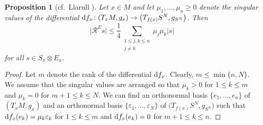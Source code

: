 \documentclass[11pt]{article}
\numberwithin{equation}{section}
\numberwithin{equation}{section}
\newtheorem{Proposition}[Theorem]{Proposition}
 { \theoremstyle{definition}
\newtheorem{Definition}[Theorem]{Definition}
\newtheorem{Note}[Theorem]{Note}
\newtheorem{Example}[Theorem]{Example}
\newtheorem{Remark}[Theorem]{Remark} }
\begin{document}
\begin{Proposition}[cf.\ Llarull \cite{Llarull}]
\label{curvature.term}
Let $x \in M$ and let $ \mu_1,\hdots,\mu_n \geq 0$ denote the singular values of the differential ${\rm d}f_x\colon (T_x M , g_x) \to \big(T_{f(x)} S^N,g_{S^N}\big)$. Then
\[
 \big|\mathcal{R}^E s\big| \leq \frac{1}{4} \sum_{\substack{1 \leq j,k \leq n\\ j \neq k}} \mu_j \mu_k |s|
\]
for all $s \in S_x \otimes E_x$.
\end{Proposition}

\begin{proof}
Let $m$ denote the rank of the differential ${\rm d}f_x$. Clearly, $m \leq \min \{n,N\}$. We assume that the singular values are arranged so that $\mu_k > 0$ for $1 \leq k \leq m$ and $\mu_k = 0$ for $m+1 \leq k \leq N$. We can find an orthonormal basis $\{e_1,\hdots,e_n\}$ of $(T_x M, g_x)$ and an orthonormal basis $\{\varepsilon_1, \ldots, \varepsilon_N\}$ of $\big(T_{f(x)} S^N, g_{S^N}\big)$ such that ${\rm d}f_x(e_k) = \mu_k \varepsilon_k$ for $1 \leq k \leq m$ and ${\rm d}f_x(e_k) = 0$ for $m+1 \leq k \leq n$.


\end{proof}
\end{document}
